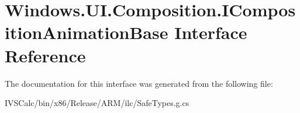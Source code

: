 \hypertarget{interface_windows_1_1_u_i_1_1_composition_1_1_i_composition_animation_base}{}\section{Windows.\+U\+I.\+Composition.\+I\+Composition\+Animation\+Base Interface Reference}
\label{interface_windows_1_1_u_i_1_1_composition_1_1_i_composition_animation_base}


The documentation for this interface was generated from the following file\+:\begin{DoxyCompactItemize}
\item 
I\+V\+S\+Calc/bin/x86/\+Release/\+A\+R\+M/ilc/Safe\+Types.\+g.\+cs\end{DoxyCompactItemize}
